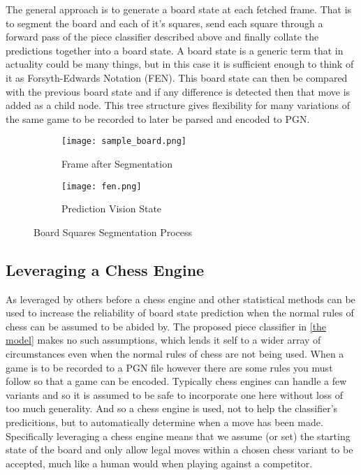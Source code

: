 The general approach is to generate a board state at each fetched frame.  That is to segment the board and each of it's squares, send each square 
through a forward pass of the piece classifier described above and finally collate the predictions together into a board state.  A board state is 
a generic term that in actuality could be many things, but in this case it is sufficient enough to think of it as Forsyth-Edwards Notation (FEN).
This board state can then be compared with the previous board state and if any difference is detected then that move is added as a child node.
This tree structure gives flexibility for many variations of the same game to be recorded to later be parsed and encoded to PGN.


\begin{figure}[h]
    \centering
    \begin{subfigure}[b]{0.48\textwidth}
        \centering
        \texttt{[image: sample\_board.png]}
        \caption{Frame after Segmentation}
    \end{subfigure}
    \hfill
    \begin{subfigure}[b]{0.48\textwidth}
        \centering
        \texttt{[image: fen.png]}
        \caption{Prediction Vision State}
    \end{subfigure}
\caption{Board Squares Segmentation Process}
\label{fig:visionstate}
\end{figure}

\subsection{Leveraging a Chess Engine}
As leveraged by others before \cite{} a chess engine and other statistical methods \cite{} can be used to increase the reliability of board state 
prediction when the normal rules of chess can be assumed to be abided by.  The proposed piece classifier in \ref{the model} makes no such assumptions, which
lends it self to a wider array of circumstances even when the normal rules of chess are not being used.
When a game is to be recorded to a PGN file however there are some rules you must follow so that a game can be encoded.  Typically chess engines can handle a few
variants and so it is assumed to be safe to incorporate one here without loss of too much generality.  And so a chess engine is used, not to help the 
classifier's predicitions, but to automatically determine when a move has been made.
Specifically leveraging a chess engine means that we assume (or set) the starting state of the board and only allow legal moves within a chosen chess variant to be 
accepted, much like a human would when playing against a competitor.  

